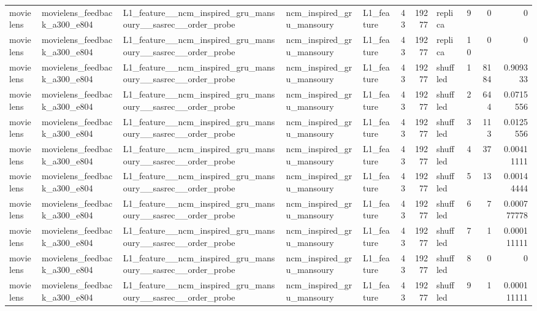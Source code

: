 \begin{table}[htbp!]
\begin{tabular}{lllllrrlrrr}
movielens & movielens\_feedback\_a300\_e804 & L1\_feature\_\_ncm\_inspired\_gru\_mansoury\_\_sasrec\_\_order\_probe & ncm\_inspired\_gru\_mansoury & L1\_feature & 43 & 19277 & replica & 9 & 0 & 0 \\
movielens & movielens\_feedback\_a300\_e804 & L1\_feature\_\_ncm\_inspired\_gru\_mansoury\_\_sasrec\_\_order\_probe & ncm\_inspired\_gru\_mansoury & L1\_feature & 43 & 19277 & replica & 10 & 0 & 0 \\
movielens & movielens\_feedback\_a300\_e804 & L1\_feature\_\_ncm\_inspired\_gru\_mansoury\_\_sasrec\_\_order\_probe & ncm\_inspired\_gru\_mansoury & L1\_feature & 43 & 19277 & shuffled & 1 & 8184 & 0.909333 \\
movielens & movielens\_feedback\_a300\_e804 & L1\_feature\_\_ncm\_inspired\_gru\_mansoury\_\_sasrec\_\_order\_probe & ncm\_inspired\_gru\_mansoury & L1\_feature & 43 & 19277 & shuffled & 2 & 644 & 0.0715556 \\
movielens & movielens\_feedback\_a300\_e804 & L1\_feature\_\_ncm\_inspired\_gru\_mansoury\_\_sasrec\_\_order\_probe & ncm\_inspired\_gru\_mansoury & L1\_feature & 43 & 19277 & shuffled & 3 & 113 & 0.0125556 \\
movielens & movielens\_feedback\_a300\_e804 & L1\_feature\_\_ncm\_inspired\_gru\_mansoury\_\_sasrec\_\_order\_probe & ncm\_inspired\_gru\_mansoury & L1\_feature & 43 & 19277 & shuffled & 4 & 37 & 0.00411111 \\
movielens & movielens\_feedback\_a300\_e804 & L1\_feature\_\_ncm\_inspired\_gru\_mansoury\_\_sasrec\_\_order\_probe & ncm\_inspired\_gru\_mansoury & L1\_feature & 43 & 19277 & shuffled & 5 & 13 & 0.00144444 \\
movielens & movielens\_feedback\_a300\_e804 & L1\_feature\_\_ncm\_inspired\_gru\_mansoury\_\_sasrec\_\_order\_probe & ncm\_inspired\_gru\_mansoury & L1\_feature & 43 & 19277 & shuffled & 6 & 7 & 0.000777778 \\
movielens & movielens\_feedback\_a300\_e804 & L1\_feature\_\_ncm\_inspired\_gru\_mansoury\_\_sasrec\_\_order\_probe & ncm\_inspired\_gru\_mansoury & L1\_feature & 43 & 19277 & shuffled & 7 & 1 & 0.000111111 \\
movielens & movielens\_feedback\_a300\_e804 & L1\_feature\_\_ncm\_inspired\_gru\_mansoury\_\_sasrec\_\_order\_probe & ncm\_inspired\_gru\_mansoury & L1\_feature & 43 & 19277 & shuffled & 8 & 0 & 0 \\
movielens & movielens\_feedback\_a300\_e804 & L1\_feature\_\_ncm\_inspired\_gru\_mansoury\_\_sasrec\_\_order\_probe & ncm\_inspired\_gru\_mansoury & L1\_feature & 43 & 19277 & shuffled & 9 & 1 & 0.000111111 \\

\end{tabular}
\end{table}

